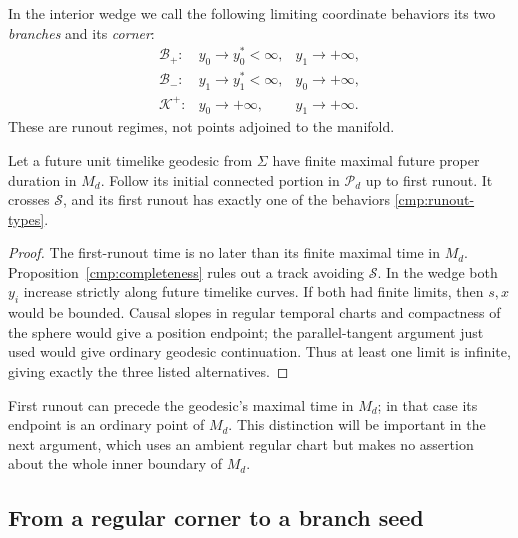 In the interior wedge we call the following limiting coordinate
behaviors its two \emph{branches} and its \emph{corner}:
\begin{equation}\label{cmp:runout-types}
 \begin{array}{lll}
 \mathcal B_+:&y_0\longrightarrow y_0^*<\infty,
                     &y_1\longrightarrow+\infty,\\
 \mathcal B_-:&y_1\longrightarrow y_1^*<\infty,
                     &y_0\longrightarrow+\infty,\\
 \mathcal K^+:&y_0\longrightarrow+\infty,
                     &y_1\longrightarrow+\infty.
 \end{array}
\end{equation}
These are runout regimes, not points adjoined to the manifold.

\begin{corollary}\label{cmp:classification}
Let a future unit timelike geodesic from $\Sigma$ have finite maximal
future proper duration in $M_d$. Follow its initial connected portion
in $\mathcal P_d$ up to first runout. It crosses $\mathcal S$, and
its first runout has exactly one of the behaviors
\eqref{cmp:runout-types}.
\end{corollary}

\begin{proof}
The first-runout time is no later than its finite maximal time in
$M_d$. Proposition~\ref{cmp:completeness} rules out a track avoiding
$\mathcal S$. In the wedge both $y_i$ increase strictly along future
timelike curves. If both had finite limits, then $s,x$ would be bounded.
Causal slopes in regular temporal charts and compactness of the sphere
would give a position endpoint; the parallel-tangent argument just used
would give ordinary geodesic continuation. Thus at least one limit is
infinite, giving exactly the three listed alternatives.
\end{proof}

First runout can precede the geodesic's maximal time in $M_d$; in that
case its endpoint is an ordinary point of $M_d$. This distinction will
be important in the next argument, which uses an ambient regular chart
but makes no assertion about the whole inner boundary of $M_d$.

\subsection{From a regular corner to a branch seed}

